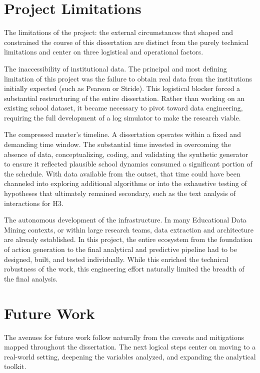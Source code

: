 \section{Project Limitations}
\label{sec:project-limitations}

The limitations of the project: the external circumstances that shaped and constrained the course of this dissertation are distinct from the purely technical limitations and center on three logistical and operational factors.

The inaccessibility of institutional data. The principal and most defining limitation of this project was the failure to obtain real data from the institutions initially expected (such as Pearson or Stride). This logistical blocker forced a substantial restructuring of the entire dissertation. Rather than working on an existing school dataset, it became necessary to pivot toward data engineering, requiring the full development of a log simulator to make the research viable.

The compressed master's timeline. A dissertation operates within a fixed and demanding time window. The substantial time invested in overcoming the absence of data, conceptualizing, coding, and validating the synthetic generator to ensure it reflected plausible school dynamics consumed a significant portion of the schedule. With data available from the outset, that time could have been channeled into exploring additional algorithms or into the exhaustive testing of hypotheses that ultimately remained secondary, such as the text analysis of interactions for H3.

The autonomous development of the infrastructure. In many Educational Data Mining contexts, or within large research teams, data extraction and architecture are already established. In this project, the entire ecosystem from the foundation of action generation to the final analytical and predictive pipeline had to be designed, built, and tested individually. While this enriched the technical robustness of the work, this engineering effort naturally limited the breadth of the final analysis.

\section{Future Work}
\label{sec:future-work}

The avenues for future work follow naturally from the caveats and mitigations mapped throughout the dissertation. The next logical steps center on moving to a real-world setting, deepening the variables analyzed, and expanding the analytical toolkit.

